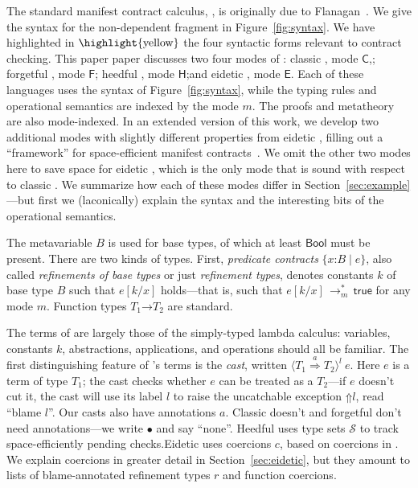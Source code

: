 \documentclass[9pt]{extarticle}
\newcommand{\ottnt}[1]{\mathit{#1}}
\begin{document}
The standard manifest contract calculus, \lambdah, is originally due
to Flanagan~\cite{Flanagan06hybrid}. We give the syntax for the
non-dependent fragment in Figure~\ref{fig:syntax}. We have highlighted
in $\highlight{\text{yellow}}$ the four syntactic forms relevant to
contract checking.
This paper paper discusses \ifpopl two \else four \fi modes of
\lambdah: classic \lambdah, mode $ \mathsf{C} $\ifpopl,\else; forgetful
\lambdah, mode $ \mathsf{F} $; heedful \lambdah, mode $ \mathsf{H} $;\fi and eidetic
\lambdah, mode $ \mathsf{E} $. Each of these languages uses the syntax of
Figure~\ref{fig:syntax}, while the typing rules and operational
semantics are indexed by the mode $\ottnt{m}$. The proofs and metatheory
are also mode-indexed.
In an extended version of this work, we develop two additional modes
with slightly different properties from eidetic \lambdah, filling out
a ``framework'' for space-efficient manifest
contracts~\cite{Greenberg14spacetr}. We omit the other two modes here
to save space for eidetic \lambdah, which is the only mode that is
sound with respect to classic \lambdah.
{\iffull We summarize how each of these modes differ in
  Section~\ref{sec:example}---but first we (laconically) explain the
  syntax and the interesting bits of the operational semantics.\fi}

The metavariable $\ottnt{B}$ is used for base types, of which at least
$ \mathsf{Bool} $ must be present. There are two kinds of types. First,
\textit{predicate contracts} $ \{ \mathit{x} \mathord{:} \ottnt{B} \mathrel{\mid} \ottnt{e} \} $, also called
\textit{refinements of base types} or just \textit{refinement types},
denotes constants $\ottnt{k}$ of base type $\ottnt{B}$ such that $ \ottnt{e}  [  \ottnt{k} / \mathit{x}  ] $
holds---that is, such that $ \ottnt{e}  [  \ottnt{k} / \mathit{x}  ]  \,  \longrightarrow ^{*}_{ \ottnt{m} }  \,  \mathsf{true} $ for any mode
$\ottnt{m}$. Function types $ \ottnt{T_{{\mathrm{1}}}} \mathord{ \rightarrow } \ottnt{T_{{\mathrm{2}}}} $ are standard.


The terms of \lambdah are largely those of the simply-typed lambda
calculus: variables, constants $\ottnt{k}$, abstractions, applications,
and operations should all be familiar. 
The first distinguishing feature of \lambdah's terms is the
\textit{cast}, written $ \langle  \ottnt{T_{{\mathrm{1}}}}  \mathord{ \overset{ \ottnt{a} }{\Rightarrow} }  \ottnt{T_{{\mathrm{2}}}}  \rangle^{ \ottnt{l} } ~  \ottnt{e} $. Here $\ottnt{e}$ is a term of
type $\ottnt{T_{{\mathrm{1}}}}$; the cast checks whether $\ottnt{e}$ can be treated as a
$\ottnt{T_{{\mathrm{2}}}}$---if $\ottnt{e}$ doesn't cut it, the cast will use its label
$\ottnt{l}$ to raise the uncatchable exception $ \mathord{\Uparrow}  \ottnt{l} $, read
``blame $\ottnt{l}$''.
Our casts also have annotations $\ottnt{a}$. Classic \ifpopl doesn't \else
and forgetful \lambdah don't \fi need annotations---we write
$ \bullet $ and say ``none''. \iffull Heedful \lambdah uses type sets $\mathcal{S}$ to
track space-efficiently pending checks.\fi Eidetic \lambdah uses
coercions $\ottnt{c}$, based on coercions in \citet{Henglein94dynamic}. We
explain coercions in greater detail in Section~\ref{sec:eidetic}, but
they amount to lists of blame-annotated refinement types $\ottnt{r}$ and
function coercions.
\end{document}
